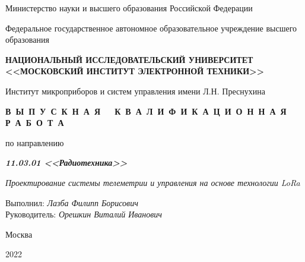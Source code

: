 \thispagestyle{empty}
\setcounter{page}{0}

\begin{center}
    Министерство науки  и высшего образования Российской Федерации

    \vspace{1ex}

    Федеральное государственное автономное образовательное учреждение высшего образования

    \textbf{НАЦИОНАЛЬНЫЙ ИССЛЕДОВАТЕЛЬСКИЙ УНИВЕРСИТЕТ <<МОСКОВСКИЙ ИНСТИТУТ ЭЛЕКТРОННОЙ ТЕХНИКИ>>}

    \vspace{1ex}

    Институт микроприборов и систем управления имени Л.Н. Преснухина
\end{center}

\vspace{22ex}

\begin{center}
    \textbf{В\ Ы\ П\ У\ С\ К\ Н\ А\ Я\ \ \ К\ В\ А\ Л\ И\ Ф\ И\ К\ А\ Ц\ И\ О\ Н\ Н\ А\ Я\ \ \ Р\ А\ Б\ О\ Т\ А}
    \vspace{1ex}

    по направлению

    \textbf{\textit{11.03.01 <<Радиотехника>>}}
    
    \textit{Проектирование системы телеметрии и управления на основе технологии LoRa}

\end{center}

\vspace{25ex}

\begin{flushright}
    \noindent
    Выполнил: \textit{Лазба Филипп Борисович} \\
    Руководитель: \textit{Орешкин Виталий Иванович}
\end{flushright}

\vfill

\begin{center}
    Москва

    2022
\end{center}

\newpage
